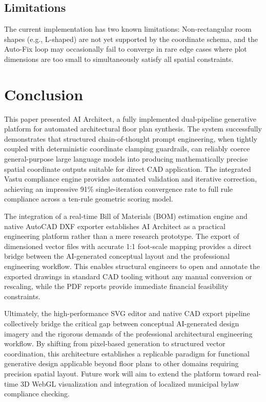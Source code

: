\documentclass[10pt, twocolumn, letterpaper]{article}
\begin{document}
\subsection{Limitations}

The current implementation has two known limitations: Non-rectangular room shapes (e.g., L-shaped) are not yet supported by the coordinate schema, and the Auto-Fix loop may occasionally fail to converge in rare edge cases where plot dimensions are too small to simultaneously satisfy all spatial constraints.

\section{Conclusion}

This paper presented AI Architect, a fully implemented dual-pipeline
generative platform for automated architectural floor plan synthesis. The
system successfully demonstrates that structured chain-of-thought prompt
engineering, when tightly coupled with deterministic coordinate clamping
guardrails, can reliably coerce general-purpose large language models into
producing mathematically precise spatial coordinate outputs suitable for direct
CAD application. The integrated Vastu compliance engine provides automated
validation and iterative correction, achieving an impressive 91\%
single-iteration convergence rate to full rule compliance across a ten-rule
geometric scoring model.

The integration of a real-time Bill of Materials (BOM) estimation engine and native AutoCAD DXF exporter establishes AI Architect as a practical engineering platform rather than a mere research prototype. The export of dimensioned vector files with accurate 1:1 foot-scale mapping provides a direct bridge between the AI-generated conceptual layout and the professional engineering workflow. This enables structural engineers to open and annotate the exported drawings in standard CAD tooling without any manual conversion or rescaling, while the PDF reports provide immediate financial feasibility constraints.

Ultimately, the high-performance SVG editor and native CAD export pipeline collectively bridge the critical gap between conceptual AI-generated design imagery and the rigorous demands of the professional architectural engineering workflow. By shifting from pixel-based generation to structured vector coordination, this architecture establishes a replicable paradigm for functional generative design applicable beyond floor plans to other domains requiring precision spatial layout. Future work will aim to extend the platform toward real-time 3D WebGL visualization and integration of localized municipal bylaw compliance checking.
\end{document}
